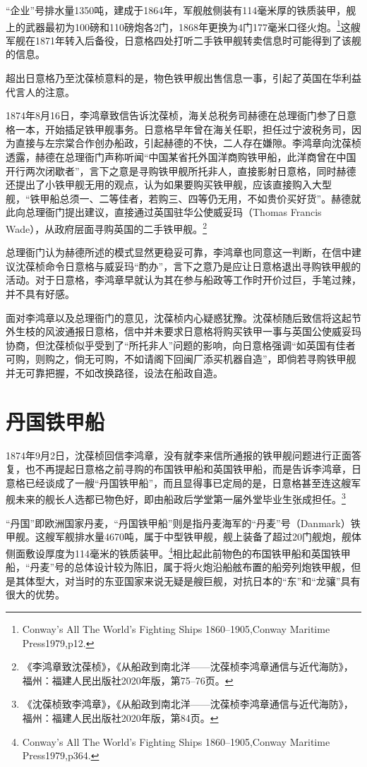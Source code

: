 \documentclass[12pt,UTF8]{ctexbook}
\begin{document}
“企业”号排水量1350吨，建成于1864年，军舰舷侧装有114毫米厚的铁质装甲，舰上的武器最初为100磅和110磅炮各2门，1868年更换为4门177毫米口径火炮。\footnote{Conway's All The World's Fighting Ships 1860--1905,Conway Maritime Press1979,p12.}这艘军舰在1871年转入后备役，日意格四处打听二手铁甲舰转卖信息时可能得到了该舰的信息。

超出日意格乃至沈葆桢意料的是，物色铁甲舰出售信息一事，引起了英国在华利益代言人的注意。

1874年8月16日，李鸿章致信告诉沈葆桢，海关总税务司赫德在总理衙门参了日意格一本，开始插足铁甲舰事务。日意格早年曾在海关任职，担任过宁波税务司，因为直接与左宗棠合作创办船政，引起赫德的不快，二人存在嫌隙。李鸿章向沈葆桢透露，赫德在总理衙门声称听闻“中国某省托外国洋商购铁甲船，此洋商曾在中国开行两次闭歇者”，言下之意是寻购铁甲舰所托非人，直接影射日意格，同时赫德还提出了小铁甲舰无用的观点，认为如果要购买铁甲舰，应该直接购入大型舰，“铁甲船总须一、二等佳者，若购三、四等仍无用，不如贵价买好货”。赫德就此向总理衙门提出建议，直接通过英国驻华公使威妥玛（Thomas Francis Wade），从政府层面寻购英国的二手铁甲舰。\footnote{《李鸿章致沈葆桢》，《从船政到南北洋——沈葆桢李鸿章通信与近代海防》，福州：福建人民出版社2020年版，第75--76页。}

总理衙门认为赫德所述的模式显然更稳妥可靠，李鸿章也同意这一判断，在信中建议沈葆桢命令日意格与威妥玛“酌办”，言下之意乃是应让日意格退出寻购铁甲舰的活动。对于日意格，李鸿章早就认为其在参与船政等工作时开价过巨，手笔过辣，并不具有好感。

面对李鸿章以及总理衙门的意见，沈葆桢内心疑惑犹豫。沈葆桢随后致信将这起节外生枝的风波通报日意格，信中并未要求日意格将购买铁甲一事与英国公使威妥玛协商，但沈葆桢似乎受到了“所托非人”问题的影响，向日意格强调“如英国有佳者可购，则购之，倘无可购，不如请阁下回闽厂添买机器自造”，即倘若寻购铁甲舰并无可靠把握，不如改换路径，设法在船政自造。

\section{丹国铁甲船}

1874年9月2日，沈葆桢回信李鸿章，没有就李来信所通报的铁甲舰问题进行正面答复，也不再提起日意格之前寻购的布国铁甲船和英国铁甲船，而是告诉李鸿章，日意格已经谈成了一艘“丹国铁甲船”，而且显得事已定局的是，日意格甚至连这艘军舰未来的舰长人选都已物色好，即由船政后学堂第一届外堂毕业生张成担任。\footnote{《沈葆桢致李鸿章》，《从船政到南北洋——沈葆桢李鸿章通信与近代海防》，福州：福建人民出版社2020年版，第84页。}

“丹国”即欧洲国家丹麦，“丹国铁甲船”则是指丹麦海军的“丹麦”号（Danmark）铁甲舰。这艘军舰排水量4670吨，属于中型铁甲舰，舰上装备了超过20门舰炮，舰体侧面敷设厚度为114毫米的铁质装甲。\footnote{Conway's All The World's Fighting Ships 1860--1905,Conway Maritime Press1979,p364.}相比起此前物色的布国铁甲船和英国铁甲船，“丹麦”号的总体设计较为陈旧，属于将火炮沿船舷布置的船旁列炮铁甲舰，但是其体型大，对当时的东亚国家来说无疑是艘巨舰，对抗日本的“东”和“龙骧”具有很大的优势。
\end{document}
